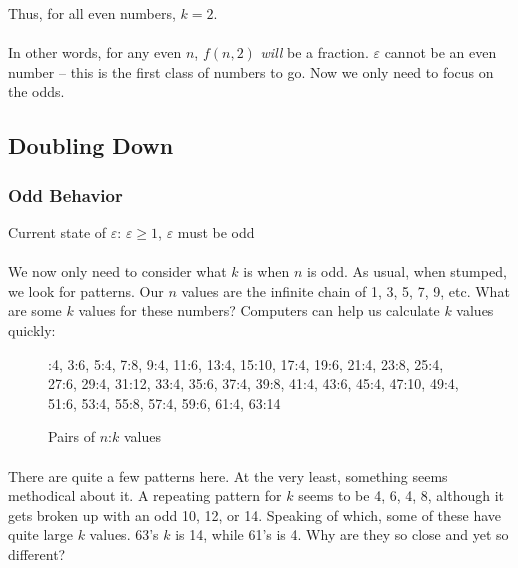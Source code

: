 \documentclass[12pt,letterpaper]{article}
\begin{document}
			\begin{figure*}[h]
				\centering
				Thus, for all even numbers, $k = 2$.
			\end{figure*}
		
			\paragraph{} In other words, for any even $n$, $f(n, 2)$ \textit{will} be a fraction. $\varepsilon$ cannot be an even number -- this is the first class of numbers to go. Now we only need to focus on the odds.
			
	\subsection{Doubling Down}
		
		\subsubsection{Odd Behavior}
		
			\begin{figure*}[h]
				\centering
				Current state of $\varepsilon$: $\varepsilon \geqslant 1$, $\varepsilon$ must be odd
			\end{figure*}
				
			\paragraph{} We now only need to consider what $k$ is when $n$ is odd. As usual, when stumped, we look for patterns. Our $n$ values are the infinite chain of 1, 3, 5, 7, 9, etc. What are some $k$ values for these numbers? Computers can help us calculate $k$ values quickly:
			
			\begin{figure}[h]
				:4, 3:6, 5:4, 7:8, 9:4, 11:6, 13:4, 15:10, 17:4, 19:6, 21:4, 23:8, 25:4, 27:6, 29:4, 31:12, 33:4, 35:6, 37:4, 39:8, 41:4, 43:6, 45:4, 47:10, 49:4, 51:6, 53:4, 55:8, 57:4, 59:6, 61:4, 63:14
				
				\caption{Pairs of $n$:$k$ values}
				\label{fig:nk}
			\end{figure}
		
			\paragraph{} There are quite a few patterns here. At the very least, something seems methodical about it. A repeating pattern for $k$ seems to be 4, 6, 4, 8, although it gets broken up with an odd 10, 12, or 14. Speaking of which, some of these have quite large $k$ values. 63's $k$ is 14, while 61's is 4. Why are they so close and yet so different?
			
\end{document}
